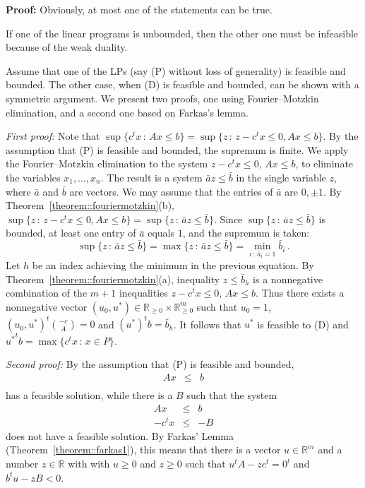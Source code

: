 \documentclass[12pt, showidx, twoside]{article}
\def\prove{\par \noindent \hbox{\bf Proof:}\quad}
\def\R{\mathbb{R}}
\begin{document}
{{{{\prove
Obviously, at most one of the statements can be true.

If one of the linear programs is unbounded, then the other one must be
infeasible because of the weak duality.

Assume that one of the LPs (say (P) without loss of generality)
is feasible and bounded. The other case, when (D) is feasible and bounded, can be shown with a symmetric argument.
We present two proofs, one using Fourier--Motzkin elimination, and a second one based on Farkas's lemma.


{\em First proof:} 
Note that $\sup \{c^t x\,:\,  Ax\le b\}=\sup\{z\,:\,  z-c^t x\leq 0, Ax\leq b\}$. By the assumption that (P) is feasible and bounded, the supremum is finite.
We apply the Fourier--Motzkin elimination to the system $z-c^t x\leq 0,\, Ax\leq b$, to eliminate the  variables $x_1,\ldots, x_n$. The result is a system $\bar a  z\leq \bar b$ in the single variable $z$, where $\bar a$ and $\bar b$ are vectors. We may assume that the entries of $\bar a$ are $0,\pm1$. By Theorem~\ref{theorem::fouriermotzkin}(b),
$\sup\{z\,:\,  z-c^t x\leq 0, Ax\leq b\}=\sup\{z\,:\,  \bar a z\leq \bar b\}$.
Since $\sup\{z\,:\,  \bar a  z\leq \bar b\}$ is bounded, at least one entry of $\bar a$  equals $1$, and the supremum is taken: 
\[
\sup\{z\,:\,  \bar a  z\leq \bar b\}=\max\{z\,:\, \bar a z\leq \bar b\}=\min_{i\,:\,  \bar a_i=1}\bar b_i\, .\]    
Let $h$ be an index achieving the minimum in the previous equation. By Theorem~\ref{theorem::fouriermotzkin}(a), inequality $ z\leq \bar b_h$ is a nonnegative combination of the $m+1$ inequalities $z-c^t x\leq 0,\, Ax\leq b$. Thus there exists a nonnegative vector $(u_0,u^*)\in\R_{\ge0}\times \R_{\ge0}^m$ such that $u_0=1$, $(u_0,u^*)^t {-c\choose A}=0$ and $({u^*})^t b=\bar b_h$. It follows that $u^*$ is feasible to (D) and ${u^*}^t b=\max\{c^t x\,:\,  x\in P\}$.

{\em Second proof:}
By the assumption that (P) is feasible and bounded,
\begin{equation}\label{eq::proof_dual_1}
\begin{array}{rcl}
Ax & \leq & b\\
\end{array}
\end{equation}
has a feasible solution, while there is a $B$ such that
the system
\begin{equation}\label{eq::proof_dual_2}
\begin{array}{rcl}
Ax & \leq & b\\
-c^tx & \leq & -B
\end{array}
\end{equation}
does not have a feasible solution.
By Farkas' Lemma (Theorem~\ref{theorem::farkas1}), this means
that there is a vector $u \in \R^m$ 
and a number $z \in \R$ with with $u \geq 0$ and $z \geq 0$
such that
$u^t A - zc^t = 0^t$ and $b^t u - zB<0$.

}}}}
\end{document}
